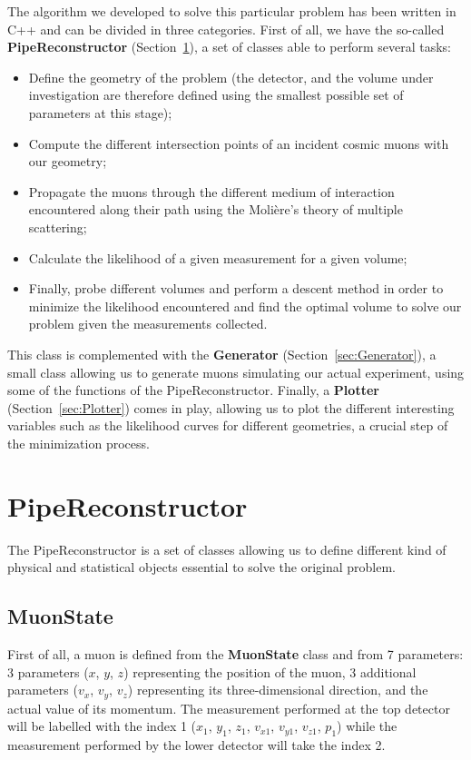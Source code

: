 \documentclass[a4paper, 11pt]{report}
\begin{document}
The algorithm we developed to solve this particular problem has been written in C++ and can be divided in three categories. First of all, we have the so-called \textbf{PipeReconstructor} (Section~\ref{sec:PipeReconstructor}), a set of classes able to perform several tasks:
\begin{itemize}
\item Define the geometry of the problem (the detector, and the volume under investigation are therefore defined using the smallest possible set of parameters at this stage);
\item Compute the different intersection points of an incident cosmic muons with our geometry;
\item Propagate the muons through the different medium of interaction encountered along their path using the Moli\`ere's theory of multiple scattering;
\item Calculate the likelihood of a given measurement for a given volume;
\item Finally, probe different volumes and perform a descent method in order to minimize the likelihood encountered and find the optimal volume to solve our problem given the measurements collected. 
\end{itemize}
This class is complemented with the \textbf{Generator} (Section~\ref{sec:Generator}), a small class allowing us to generate muons simulating our actual experiment, using some of the functions of the PipeReconstructor. Finally, a \textbf{Plotter} (Section~\ref{sec:Plotter}) comes in play, allowing us to plot the different interesting variables such as the likelihood curves for different geometries, a crucial step of the minimization process.

\section{PipeReconstructor} \label{sec:PipeReconstructor}

The PipeReconstructor is a set of classes allowing us to define different kind of physical and statistical objects essential to solve the original problem.

\subsection{MuonState}

First of all, a muon is defined from the \textbf{MuonState} class and from 7 parameters: 3 parameters ($x$, $y$, $z$) representing the position of the muon, 3 additional parameters ($v_x$, $v_y$, $v_z$) representing its three-dimensional direction, and the actual value of its momentum. The measurement performed at the top detector will be labelled with the index 1 ($x_1$, $y_1$, $z_1$, $v_{x1}$, $v_{y1}$, $v_{z1}$, $p_1$) while the measurement performed by the lower detector will take the index 2.
\end{document}
